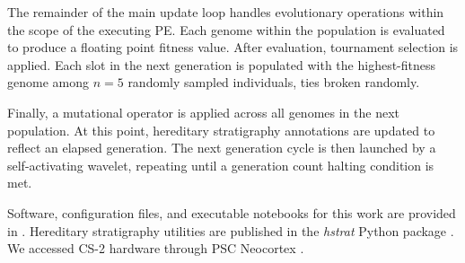 The remainder of the main update loop handles evolutionary operations within the scope of the executing PE.
Each genome within the population is evaluated to produce a floating point fitness value.
After evaluation, tournament selection is applied.
Each slot in the next generation is populated with the highest-fitness genome among $n=5$ randomly sampled individuals, ties broken randomly.

Finally, a mutational operator is applied across all genomes in the next population.
At this point, hereditary stratigraphy annotations are updated to reflect an elapsed generation.
The next generation cycle is then launched by a self-activating wavelet, repeating until a generation count halting condition is met.




Software, configuration files, and executable notebooks for this work are provided in \citep{moreno2024trackableTODO}.
Hereditary stratigraphy utilities are published in the \textit{hstrat} Python package \citep{moreno2022hstrat}.
We accessed CS-2 hardware through PSC Neocortex \citep{buitrago2021neocortex}.

